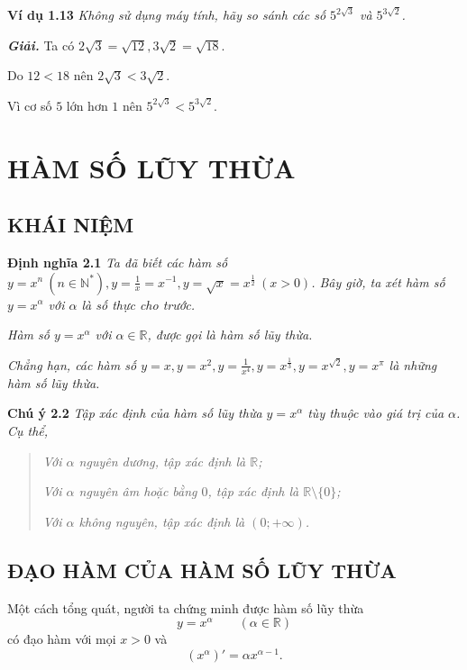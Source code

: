 \documentclass{article}
\begin{document}
\textbf{Ví dụ 1.13} \textit{Không sử dụng máy tính, hãy so sánh các số $5^{2\sqrt{3}}$ và $5^{3\sqrt{2}}$.}

\textbf{\color{blue}\textit{Giải.}} Ta có $2\sqrt{3} = \sqrt{12}, 3\sqrt{2} = \sqrt{18}$.

Do $12 < 18$ nên $2\sqrt{3} < 3\sqrt{2}$.

Vì cơ số $5$ lớn hơn $1$ nên $5^{2\sqrt{3}} < 5^{3\sqrt{2}}$.
\newpage
\section{HÀM SỐ LŨY THỪA}

\subsection{KHÁI NIỆM}

\textbf{Định nghĩa 2.1} \textit{Ta đã biết các hàm số $y = x^n \ (n \in \mathbb{N}^*), y = \frac{1}{x} = x^{-1}, y = \sqrt{x} = x^{\frac{1}{2}} \ (x > 0)$. Bây giờ, ta xét hàm số $y = x^\alpha$ với $\alpha$ là số thực cho trước.}

\begin{center}
\textit{Hàm số $y = x^\alpha$ với $\alpha \in \mathbb{R}$, được gọi là hàm số lũy thừa.}
\end{center}

\textit{Chẳng hạn, các hàm số $y = x, y = x^2, y = \frac{1}{x^4}, y = x^{\frac{1}{3}}, y = x^{\sqrt{2}}, y = x^\pi$ là những hàm số lũy thừa.}

\vspace{0.5cm}

\textbf{Chú ý 2.2} \textit{Tập xác định của hàm số lũy thừa $y = x^\alpha$ tùy thuộc vào giá trị của $\alpha$. Cụ thể,}

\begin{quote}
\textit{Với $\alpha$ nguyên dương, tập xác định là $\mathbb{R}$;}

\textit{Với $\alpha$ nguyên âm hoặc bằng $0$, tập xác định là $\mathbb{R} \setminus \{0\}$;}

\textit{Với $\alpha$ không nguyên, tập xác định là $(0; +\infty)$.}
\end{quote}
\subsection{ĐẠO HÀM CỦA HÀM SỐ LŨY THỪA}

Một cách tổng quát, người ta chứng minh được hàm số lũy thừa
\[
y=x^\alpha \qquad (\alpha\in\mathbb{R})
\]
có đạo hàm với mọi \(x>0\) và
\[
\left(x^\alpha\right)'=\alpha x^{\alpha-1}.
\]
\end{document}
